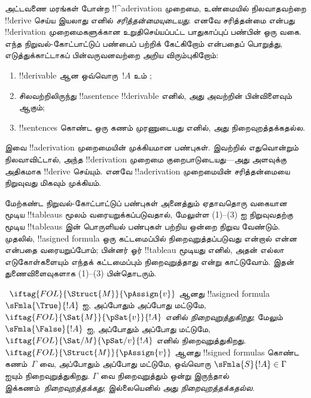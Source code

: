 \documentclass[../../../include/open-logic-section]{subfiles}
\begin{document}
      {}
      {}
      

\begin{explain}
அட்டவணை மரங்கள் போன்ற !!^a{derivation} முறைமை, உண்மையில் நிலவாதவற்றை
!!{derive} செய்ய இயலாது எனில் \emph{சரித்தன்மையுடையது}. எனவே சரித்தன்மை
என்பது !!{derivation} முறைமைகளுக்கான உறுதிசெய்யப்பட்ட பாதுகாப்புப் பண்பின்
ஒரு வகை. எந்த நிறுவல்-கோட்பாட்டுப் பண்பைப் பற்றிக் கேட்கிறோம் என்பதைப்
பொறுத்து, எடுத்துக்காட்டாகப் பின்வருவனவற்றை அறிய விரும்புகிறோம்:
\begin{enumerate}
\item !!{derivable} ஆன ஒவ்வொரு~$!A$ உம் ;
\item சிலவற்றிலிருந்து !!a{sentence} !!{derivable} எனில், அது அவற்றின்
  பின்விளைவும் ஆகும்;
\item !!{sentence}s கொண்ட ஒரு கணம் முரணுடையது எனில், அது நிறைவுறத்தக்கதல்ல.
\end{enumerate}
இவை !!a{derivation} முறைமையின் முக்கியமான பண்புகள். இவற்றில் எதுவொன்றும்
நிலவாவிட்டால், அந்த !!{derivation} முறைமை குறைபாடுடையது—அது அளவுக்கு
அதிகமாக !!{derive} செய்யும். எனவே !!a{derivation} முறைமையின் சரித்தன்மையை
நிறுவுவது மிகவும் முக்கியம்.

மேற்கண்ட நிறுவல்-கோட்பாட்டுப் பண்புகள் அனைத்தும் ஏதாவதொரு வகையான மூடிய
!!{tableau}s மூலம் வரையறுக்கப்படுவதால், மேலுள்ள (1)--(3) ஐ நிறுவுவதற்கு
மூடிய !!{tableau}s இன் பொருளியல் பண்புகள் பற்றிய ஒன்றை நிறுவ வேண்டும்.
முதலில், !!a{signed formula} ஒரு கட்டமைப்பில் நிறைவுறுத்தப்படுவது என்றால் என்ன என்பதை
வரையறுப்போம்; பின்னர் ஓர் !!{tableau} மூடியது எனில், அதன் எல்லா
எடுகோள்களையும் எந்தக் கட்டமைப்பும் நிறைவுறுத்தாது என்று காட்டுவோம். இதன்
துணைவிளைவுகளாக (1)--(3) பின்தொடரும்.
\end{explain}

\begin{defn}
~$\iftag{FOL}{\Struct{M}}{\pAssign{v}}$
ஆனது !!a{signed formula}~$\sFmla{\True}{!A}$ ஐ, அப்போதும் அப்போது மட்டுமே,
$\iftag{FOL}{\Sat{M}}{\pSat{v}}{!A}$ எனில் \emph{நிறைவுறுத்துகிறது}; மேலும்
$\sFmla{\False}{!A}$ ஐ, அப்போதும் அப்போது மட்டுமே,
$\iftag{FOL}{\Sat/{M}}{\pSat/{v}}{!A}$ எனில் நிறைவுறுத்துகிறது.
$\iftag{FOL}{\Struct{M}}{\pAssign{v}}$ ஆனது !!{signed formula}s கொண்ட
கணம்~$\Gamma$ வை, அப்போதும் அப்போது மட்டுமே, ஒவ்வொரு
$\sFmla{S}{!A} \in \Gamma$ ஐயும் நிறைவுறுத்துகிறது. $\Gamma$ வை
நிறைவுறுத்தும்  ஒன்று இருந்தால்
இக்கணம்~\emph{நிறைவுறத்தக்கது}; இல்லையெனில் அது
\emph{நிறைவுறத்தக்கதல்ல}.
\end{defn}
\end{document}
